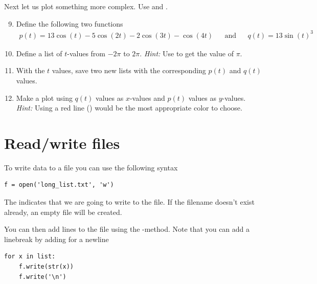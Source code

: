 \documentclass{article}
\begin{document}
Next let us plot something more complex. Use  and .

\begin{enumerate}
    \setcounter{enumi}{8}
    \item Define the following two functions
    \begin{align}
         p(t) = 13\cos(t) - 5 \cos(2t) - 2 \cos(3t) - \cos(4t) && \text{and} && q(t) = 13\sin(t)^3 
    \end{align}

    \item Define a list of $t$-values from $-2\pi$ to $2\pi$.
      {\em Hint:} Use  to get the value of $\pi$.

    \item With the $t$ values, save two new lists with the corresponding $p(t)$ and $q(t)$ values.

    \item Make a plot using $q(t)$ values as $x$-values and $p(t)$ values as $y$-values.
        {\em Hint:} Using a red line () would be the most appropriate color to choose.


\end{enumerate}


\section{Read/write files}



To write data to a file you can use the following syntax
\begin{lstlisting}
f = open('long_list.txt', 'w')
\end{lstlisting}

The  indicates that we are going to write to the file.
If the filename doesn't exist already, an empty file will be created.

You can then add lines to the file using the -method.
Note that you can add a linebreak by adding  for a newline

\begin{lstlisting}
for x in list:
    f.write(str(x))
    f.write('\n')
\end{lstlisting}
\end{document}
